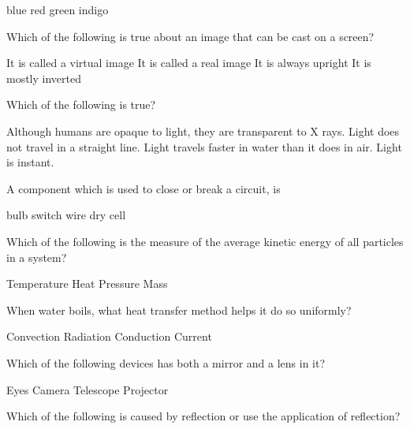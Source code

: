 \documentclass[12pt,addpoints]{exam}
\begin{document}
{{{\begin{questions}
					\begin{oneparchoices}
						\choice blue
						\choice red
						\choice green
						\choice indigo
					\end{oneparchoices}
					\question Which of the following is true about an image that can be cast on a screen? \\
					\begin{oneparchoices}
						\choice It is called a virtual image
						\choice It is called a real image
						\choice It is always upright
						\choice It is mostly inverted
					\end{oneparchoices}
					\question Which of the following is true?
					\begin{choices}
						\choice Although humans are opaque to light, they are transparent to X rays.
						\choice Light does not travel in a straight line.
						\choice Light travels faster in water than it does in air.
						\choice Light is instant. 
					\end{choices}
					\question A component which is used to close or break a circuit, is \\
					\begin{oneparchoices}
						\choice bulb
						\choice switch
						\choice wire
						\choice dry cell
					\end{oneparchoices}
					\question Which of the following is the measure of the average kinetic energy of all particles in a system? \\
					\begin{oneparchoices}
						\choice Temperature
						\choice Heat
						\choice Pressure
						\choice Mass
					\end{oneparchoices}
					\question When water boils, what heat transfer method helps it do so uniformly? \\
					\begin{oneparchoices}
						\choice Convection
						\choice Radiation
						\choice Conduction
						\choice Current
					\end{oneparchoices}
					\question Which of the following devices has both a mirror and a lens in it? \\
					\begin{oneparchoices}
						\choice Eyes
						\choice Camera
						\choice Telescope
						\choice Projector
					\end{oneparchoices}
					\question Which of the following is caused by reflection or use the application of reflection? \\
					\begin{oneparchoices}

\end{oneparchoices}
\end{questions}}}}
\end{document}

